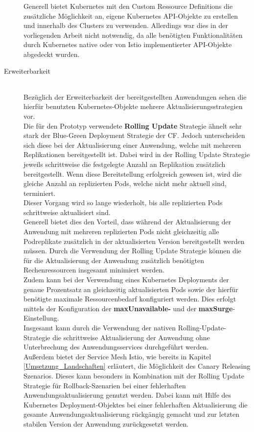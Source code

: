 \begin{description}
Generell bietet Kubernetes mit den Custom Ressource Definitions die zusätzliche Möglichkeit an, eigene Kubernetes \ac{API}-Objekte zu erstellen und innerhalb des Clusters zu verwenden. Allerdings war dies in der vorliegenden Arbeit nicht notwendig, da alle benötigten Funktionalitäten durch Kubernetes native oder von Istio implementierter \ac{API}-Objekte abgedeckt wurden.\autocite[Vgl.][]{KubernetesAuthors.20191210}\\
\item[Erweiterbarkeit] \hfill \\
Bezüglich der Erweiterbarkeit der bereitgestellten Anwendungen sehen die hierfür benutzten Kubernetes-Objekte mehrere Aktualisierungsstrategien vor.\\
Die für den Prototyp verwendete \textbf{Rolling Update} Strategie ähnelt sehr stark der Blue-Green Deployment Strategie der \ac{CF}. Jedoch unterscheiden sich diese bei der Aktualisierung einer Anwendung, welche mit mehreren Replikationen bereitgestellt ist. Dabei wird in der Rolling Update Strategie jeweils schrittweise die festgelegte Anzahl an Replikation zusätzlich bereitgestellt. 
\newpage
Wenn diese Bereitstellung erfolgreich gewesen ist, wird die gleiche Anzahl an replizierten Pods, welche nicht mehr aktuell sind, terminiert. \\
Dieser Vorgang wird so lange wiederholt, bis alle replizierten Pods schrittweise aktualisiert sind.\\
Generell bietet dies den Vorteil, dass während der Aktualisierung der Anwendung mit mehreren replizierten Pods nicht gleichzeitig alle Podreplikate zusätzlich in der aktualisierten Version bereitgestellt werden müssen. Durch die Verwendung der Rolling Update Strategie können die für die Aktualisierung der Anwendung zusätzlich benötigten Rechenressourcen insgesamt minimiert werden.\\
Zudem kann bei der Verwendung eines Kubernetes Deployments der genaue Prozentsatz an gleichzeitig aktualisierten Pods sowie der hierfür benötigte maximale Ressourcenbedarf konfiguriert werden. Dies erfolgt mittels der Konfiguration der \textbf{maxUnavailable-} und der \textbf{maxSurge}-Einstellung.\autocite[Vgl.][]{KubernetesAuthors.20191122}\\
Insgesamt kann durch die Verwendung der nativen Rolling-Update-Strategie die schrittweise Aktualisierung der Anwendung ohne Unterbrechung des Anwendungsservices durchgeführt werden.\\
Außerdem bietet der Service Mesh Istio, wie bereits in Kapitel \ref{Umsetzung_Landschaften} erläutert, die Möglichkeit des Canary Releasing Szenarios. Dieses kann besonders in Kombination mit der Rolling Update Strategie für Rollback-Szenarien bei einer fehlerhaften Anwendungsaktualisierung genutzt werden. Dabei kann mit Hilfe des Kubernetes Deployment-Objektes bei einer fehlerhaften Aktualisierung die gesamte Anwendungsaktualisierung rückgängig gemacht und zur letzten stabilen Version der Anwendung zurückgesetzt werden.\\

\end{description}
